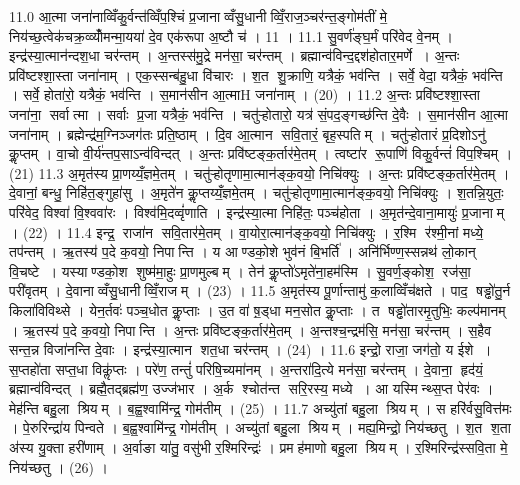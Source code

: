 11.0
आ॒त्मा जना॑नाव्विँकु॒र्वन्त॑व्विँप॒श्चिं प्र॒जानाव्वँसु॒धानीव्विँ॒राज॒ञ्चर॑न्त॒ङ्गोम॑तीं मे॒ निय॑च्छ॒त्वेक॑चक्र॒व्व्योँ॑मन्मा॒यया॑ दे॒व एक॑रूपा अ॒ष्टौ च॑ । 11 ।
11.1
सु॒वर्ण॑ङ्घ॒र्मं परि॑वेद वे॒नम् । इन्द्र॑स्या॒त्मान॑न्दश॒धा चर॑न्तम् । अ॒न्तस्स॑मु॒द्रे मन॑सा॒ चर॑न्तम् । ब्रह्मान्व॑विन्द॒द्दश॑होतार॒मर्णे । अ॒न्तः प्रवि॑ष्टश्शा॒स्ता जना॑नाम् । एक॒स्सन्ब॑हु॒धा वि॑चारः । श॒त शु॒क्राणि॒ यत्रैकं॒ भव॑न्ति । सर्वे॒ वेदा॒ यत्रैकं॒ भव॑न्ति । सर्वे॒ होता॑रो॒ यत्रैकं॒ भव॑न्ति । स॒मान॑सीन आ॒त्माH जना॑नाम् । (20) ।
11.2
अ॒न्तः प्रवि॑ष्टश्शा॒स्ता जना॑ना॒॒ सर्वात्मा । सर्वाः प्र॒जा यत्रैकं॒ भव॑न्ति । चतु॑ऱ्होतारो॒ यत्र॑ सं॒पद॒ङ्गच्छ॑न्ति दे॒वैः । स॒मान॑सीन आ॒त्मा जना॑नाम् । ब्रह्मेन्द्र॑म॒ग्निञ्जग॑तः प्रति॒ष्ठाम् । दि॒व आ॒त्मान॑ सवि॒तारं॒ बृह॒स्पतिम् । चतु॑ऱ्होतारं प्र॒दिशोऽनु॑ कॢ॒प्तम् । वा॒चो वी॒र्य॑न्तप॒साऽन्व॑विन्दत् । अ॒न्तः प्रवि॑ष्टङ्क॒र्तार॑मे॒तम् । त्वष्टा॑र रू॒पाणि॑ विकु॒र्वन्तं॑ विप॒श्चिम् । (21)
11.3
अ॒मृत॑स्य प्रा॒णय्यँ॒ज्ञमे॒तम् । चतु॑ऱ्होतृणामा॒त्मान॑ङ्क॒वयो॒ निचि॑क्युः । अ॒न्तः प्रवि॑ष्टङ्क॒र्तार॑मे॒तम् । दे॒वानां॒ बन्धु॒ निहि॑त॒ङ्गुहा॑सु । अ॒मृते॑न कॢ॒प्तय्यँ॒ज्ञमे॒तम् । चतु॑ऱ्होतृणामा॒त्मान॑ङ्क॒वयो॒ निचि॑क्युः । श॒तन्नि॒युतः॒ परि॑वेद॒ विश्वा॑ वि॒श्ववा॑रः । विश्व॑मि॒दव्वृं॑णाति । इन्द्र॑स्या॒त्मा निहि॑तः॒ पञ्च॑होता । अ॒मृत॑न्दे॒वाना॒मायुः॑ प्र॒जानाम् । (22) ।
11.4
इन्द्र॒॒ राजा॑न सवि॒तार॑मे॒तम् । वा॒योरा॒त्मान॑ङ्क॒वयो॒ निचि॑क्युः । र॒श्मि र॑श्मी॒नां मध्ये॒ तप॑न्तम् । ऋ॒तस्य॑ प॒दे क॒वयो॒ निपान्ति । य आण्डको॒शे भुव॑नं बि॒भर्ति॑ । अनि॑र्भिण्ण॒स्सन्नथ॑ लो॒कान् वि॒चष्टे । यस्याण्डको॒श शुष्म॑मा॒हुः प्रा॒णमुल्बम् । तेन॑ कॢ॒प्तो॑ऽमृते॑ना॒हम॑स्मि । सु॒वर्ण॒ङ्कोश॒॒ रज॑सा॒ परी॑वृतम् । दे॒वानाव्वँसु॒धानीव्विँ॒राजम् । (23) ।
11.5
अ॒मृत॑स्य पू॒र्णान्तामु॑ क॒लाव्विँच॑क्षते । पाद॒॒ षड्ढो॑तु॒र्न किला॑विविथ्से । येन॒र्तवः॑ पञ्च॒धोत कॢ॒प्ताः । उ॒त वा॑ ष़॒ड्धा मन॒सोत कॢ॒प्ताः । त षड्ढो॑तारमृ॒तुभिः॒ कल्प॑मानम् । ऋ॒तस्य॑ प॒दे क॒वयो॒ निपान्ति । अ॒न्तः प्रवि॑ष्टङ्क॒र्तार॑मे॒तम् । अ॒न्तश्च॒न्द्रम॑सि॒ मन॑सा॒ चर॑न्तम् । स॒हैव सन्त॒न्न विजा॑नन्ति दे॒वाः । इन्द्र॑स्या॒त्मान॑ शत॒धा चर॑न्तम् । (24) ।
11.6
इन्द्रो॒ राजा॒ जग॑तो॒ य ईशे । स॒प्तहो॑ता सप्त॒धा विकॢ॑प्तः । परे॑ण॒ तन्तुं॑ परिषि॒च्यमा॑नम् । अ॒न्तरा॑दि॒त्ये मन॑सा॒ चर॑न्तम् । दे॒वाना॒॒ हृद॑यं॒ ब्रह्मान्व॑विन्दत् । ब्रह्मै॒तद्ब्रह्म॑ण॒ उज्ज॑भार । अ॒र्क श्चोत॑न्त सरि॒रस्य॒ मध्ये । आ यस्मिन्थ्स॒प्त पेर॑वः । मेह॑न्ति बहु॒ला श्रियम् । ब॒ह्व॒श्वामि॑न्द्र॒ गोम॑तीम् । (25) ।
11.7
अच्यु॑तां बहु॒ला श्रियम् । स हरि॑र्वसु॒वित्त॑मः । पे॒रुरिन्द्रा॑य पिन्वते । ब॒ह्व॒श्वामि॑न्द्र॒ गोम॑तीम् । अच्यु॑तां बहु॒ला श्रियम् । मह्य॒मिन्द्रो॒ निय॑च्छतु । श॒त श॒ता अ॑स्य यु॒क्ता हरी॑णाम् । अ॒र्वाङा या॑तु॒ वसु॑भी र॒श्मिरिन्द्रः॑ । प्रमह॑माणो बहु॒ला श्रियम् । र॒श्मिरिन्द्र॑स्सवि॒ता मे॒ निय॑च्छतु । (26) ।
